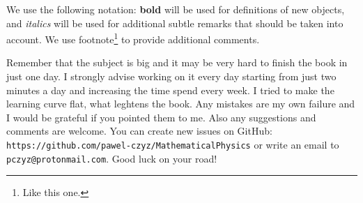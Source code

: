 We use the following notation: \textbf{bold} will be used for definitions of new objects, and \textit{italics} will be used for additional subtle remarks that should be taken into
account. We use footnote\footnote{Like this one.} to provide additional comments.


Remember that the subject is big and it may be very hard to finish the book in just one day. I strongly advise working on it every day starting from just two minutes a day
and increasing the time spend every week. I tried to make the learning curve flat, what leghtens the book.
Any mistakes are my own failure and I would be grateful if you pointed them to me. Also any suggestions and comments are welcome. You can
create new issues on GitHub: \texttt{https://github.com/pawel-czyz/MathematicalPhysics} or write an email to \texttt{pczyz@protonmail.com}.
Good luck on your road!
%
